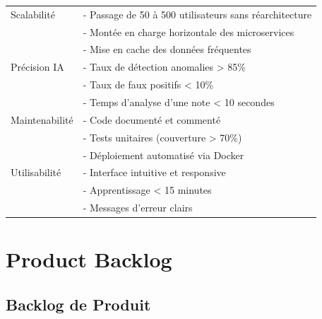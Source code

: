 \documentclass[12pt,a4paper]{report}
\begin{document}
\begin{table}[H]
\begin{tabular}{|p{3.5cm}|p{10cm}|}
 \hline

 Scalabilité & - Passage de 50 à 500 utilisateurs sans réarchitecture \\

 & - Montée en charge horizontale des microservices \\

 & - Mise en cache des données fréquentes \\

 \hline

 Précision IA & - Taux de détection anomalies > 85\% \\

 & - Taux de faux positifs < 10\% \\

 & - Temps d'analyse d'une note < 10 secondes \\

 \hline

 Maintenabilité & - Code documenté et commenté \\

 & - Tests unitaires (couverture > 70\%) \\

 & - Déploiement automatisé via Docker \\

 \hline

 Utilisabilité & - Interface intuitive et responsive \\

 & - Apprentissage < 15 minutes \\

 & - Messages d'erreur clairs \\

 \hline

 \end{tabular}

\end{table}

\newpage

\section{Product Backlog}

\subsection{Backlog de Produit}


\label{tab:backlog}
\end{document}
